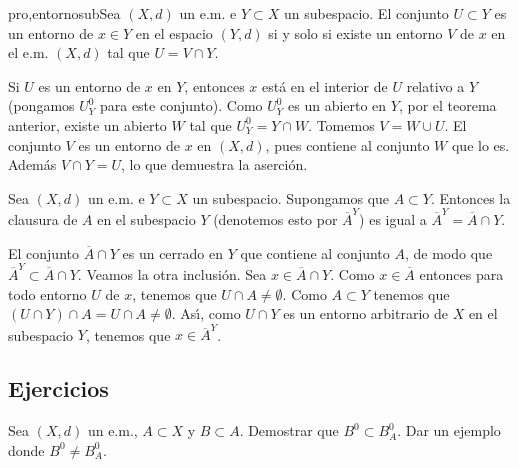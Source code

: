 \begin{proposicion}{pro,entornosub}Sea $(X,d)$ un e.m. e $Y\subset X$ un
subespacio. El conjunto $U\subset Y$ es un entorno de $x\in Y$ en
el espacio $(Y,d)$ si y solo si existe un entorno $V$ de $x$ en el
e.m. $(X,d)$ tal que $U=V\cap Y$.
\end{proposicion}
\begin{demo}
Si $U$ es un entorno de $x$ en $Y$, entonces $x$
está en el interior de $U$ relativo a $Y$ (pongamos $U^0_Y$ para
este conjunto). Como $U^0_Y$ es un abierto en $Y$, por el teorema
anterior, existe un abierto $W$ tal que $U^0_Y=Y\cap W$. Tomemos
$V=W\cup U$. El conjunto $V$ es un entorno de $x$ en $(X,d)$, pues
contiene al conjunto $W$ que lo es. Además $V\cap Y=U$, lo que
demuestra la aserción.
\end{demo}







\begin{proposicion}{} Sea $(X,d)$ un e.m. e $Y\subset X$ un
subespacio. Supongamos que $A\subset Y$. Entonces la clausura de
$A$ en el subespacio $Y$ (denotemos esto por $\overline{A}^Y$) es
igual a $\overline{A}^Y=\overline{A}\cap Y$.
\end{proposicion}
\begin{demo} El conjunto $\overline{A}\cap Y$ es un cerrado en $Y$
que contiene al conjunto $A$, de modo que
$\overline{A}^Y\subset\overline{A}\cap Y$. Veamos la otra
inclusión. Sea $x\in \overline{A}\cap Y$. Como $x\in
\overline{A}$ entonces para todo entorno $U$ de $x$, tenemos que
$U\cap A\neq\emptyset$. Como $A\subset Y$ tenemos que $(U\cap
Y)\cap A=U\cap A\neq\emptyset$. As\'{\i}, como $U\cap Y$ es un
entorno  arbitrario de $X$ en el subespacio $Y$, tenemos que
$x\in\overline{A}^Y$.
\end{demo}

\subsection{Ejercicios}

\begin{ejercicio}{} Sea $(X,d)$ un e.m., $A\subset X$ y $B\subset
A$.  Demostrar que $B^0\subset B^0_A$. Dar un ejemplo donde
$B^0\neq B^0_A$.
\end{ejercicio}

